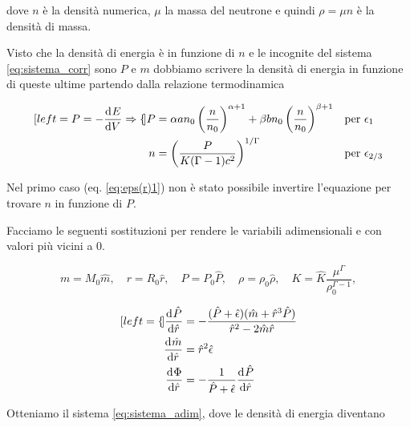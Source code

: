 \documentclass[a4paper, titlepage]{article}
\begin{document}
dove $n$ è la densità numerica, $\mu$ la massa del neutrone e quindi
$\rho = \mu n$ è la densità di massa.

Visto che la densità di energia è in funzione di $n$ e le incognite del
sistema \ref{eq:sistema_corr} sono $P$ e $m$ dobbiamo scrivere la densità di
energia in funzione di queste ultime partendo dalla relazione termodinamica

\begin{subequations}
    \label{eq:eps(r)}
    \begin{align}[left = {P = - \dv[]{E}{V} \Rightarrow \empheqlbrace}]
        P &= \alpha a n_0 \left( \frac{n}{n_0} \right)^{\alpha + 1}
        + \beta b n_0 \left( \frac{n}{n_0} \right)^{\beta + 1}
        && \text{per } \epsilon_1 \label{eq:eps(r)1} \\
        n &= \left( \frac{P}{K(\Gamma - 1) c^2} \right)^{1 / \Gamma}
        && \text{per } \epsilon_{2/3} \label{eq:eps(r)23}
    \end{align}
\end{subequations}

Nel primo caso (eq. \ref{eq:eps(r)1}) non è stato possibile invertire
l'equazione per trovare $n$ in funzione di $P$.

Facciamo le seguenti sostituzioni per rendere le variabili adimensionali e con
valori più vicini a 0.

\begin{equation*}
    m=M_0\hat m, \quad 
    r=R_0\hat r, \quad 
    P=P_0\hat P, \quad
    \rho=\rho_0 \hat{\rho}, \quad
    K = \hat{K}\frac{\mu^\Gamma}{\rho_0^{\Gamma-1}},
\end{equation*}

\begin{subequations}
    \begin{align}[left = {\empheqlbrace}]
        \dv[]{\hat P}{\hat r} &=
        - \frac{(\hat P + \hat{\epsilon})(\hat m + \hat r^3 \hat P)}
        {\hat r^2-2\hat m\hat r} \label{eq:P_ad} \\
        \dv[]{\hat m}{\hat r} &= \hat r^2 \hat{\epsilon} \label{eq:m_ad} \\
        \dv[]{\Phi}{\hat r} &= - \frac{1}{\hat P + \hat{\epsilon}}
        \dv[]{\hat P}{\hat r} \label{eq:Phi_ad}
    \end{align}
    \label{eq:sistema_adim}
\end{subequations}

Otteniamo il sistema \ref{eq:sistema_adim}, dove le densità di energia diventano
\end{document}
